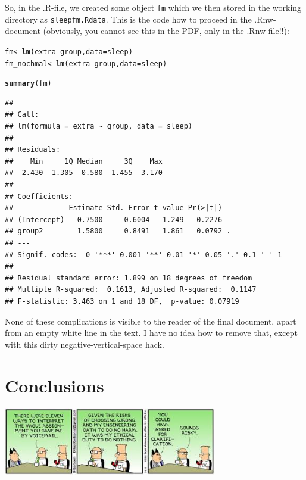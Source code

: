 \documentclass[a4paper, 11pt]{article}\usepackage[]{graphicx}\usepackage[]{color}
\makeatletter
\newcommand{\hlopt}[1]{\textcolor[rgb]{0,0,0}{#1}}%
\newcommand{\hlstd}[1]{\textcolor[rgb]{0.345,0.345,0.345}{#1}}%
\newcommand{\hlkwb}[1]{\textcolor[rgb]{0.69,0.353,0.396}{#1}}%
\newcommand{\hlkwc}[1]{\textcolor[rgb]{0.333,0.667,0.333}{#1}}%
\newcommand{\hlkwd}[1]{\textcolor[rgb]{0.737,0.353,0.396}{\textbf{#1}}}%
\newenvironment{kframe}{%
 \def\at@end@of@kframe{}%
 \ifinner\ifhmode%
  \def\at@end@of@kframe{\end{minipage}}%
  \begin{minipage}{\columnwidth}%
 \fi\fi%
 \def\FrameCommand##1{\hskip\@totalleftmargin \hskip-\fboxsep
 \colorbox{shadecolor}{##1}\hskip-\fboxsep
     \hskip-\linewidth \hskip-\@totalleftmargin \hskip\columnwidth}%
 \MakeFramed {\advance\hsize-\width
   \@totalleftmargin\z@ \linewidth\hsize
   \@setminipage}}%
 {\par\unskip\endMakeFramed%
 \at@end@of@kframe}
\newenvironment{knitrout}{}{} %
\makeatother
\begin{document}
So, in the .R-file, we created some object \texttt{fm} which we then stored in the working directory as \texttt{sleepfm.Rdata}. This is the code how to proceed in the .Rnw-document (obviously, you cannot see this in the PDF, only in the .Rnw file!!):

\begin{knitrout}\small
{}\color{fgcolor}\begin{kframe}
\begin{alltt}
\hlstd{fm} \hlkwb{<-} \hlkwd{lm}\hlstd{(extra} \hlopt{~} \hlstd{group,} \hlkwc{data}\hlstd{=sleep)}
\hlstd{fm_nochmal} \hlkwb{<-} \hlkwd{lm}\hlstd{(extra} \hlopt{~} \hlstd{group,} \hlkwc{data}\hlstd{=sleep)}
\end{alltt}
\end{kframe}
\end{knitrout}

\vspace{-2\baselineskip} %
\begin{knitrout}\small
{}\color{fgcolor}\begin{kframe}
\begin{alltt}
\hlkwd{summary}\hlstd{(fm)}
\end{alltt}
\begin{verbatim}
## 
## Call:
## lm(formula = extra ~ group, data = sleep)
## 
## Residuals:
##    Min     1Q Median     3Q    Max 
## -2.430 -1.305 -0.580  1.455  3.170 
## 
## Coefficients:
##             Estimate Std. Error t value Pr(>|t|)  
## (Intercept)   0.7500     0.6004   1.249   0.2276  
## group2        1.5800     0.8491   1.861   0.0792 .
## ---
## Signif. codes:  0 '***' 0.001 '**' 0.01 '*' 0.05 '.' 0.1 ' ' 1
## 
## Residual standard error: 1.899 on 18 degrees of freedom
## Multiple R-squared:  0.1613,	Adjusted R-squared:  0.1147 
## F-statistic: 3.463 on 1 and 18 DF,  p-value: 0.07919
\end{verbatim}
\end{kframe}
\end{knitrout}
None of these complications is visible to the reader of the final document, apart from an empty white line in the text. I have no idea how to remove that, except with this dirty negative-vertical-space hack.


\section{Conclusions}%
\begin{center}
\includegraphics[width=0.7\textwidth]{Dilbert_uncertainty}
\end{center}
\end{document}
